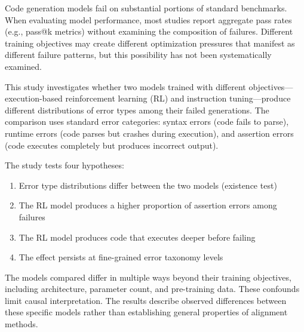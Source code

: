 
Code generation models fail on substantial portions of standard benchmarks. When evaluating model performance, most studies report aggregate pass rates (e.g., pass@k metrics) without examining the composition of failures. Different training objectives may create different optimization pressures that manifest as different failure patterns, but this possibility has not been systematically examined.

This study investigates whether two models trained with different objectives---execution-based reinforcement learning (RL) and instruction tuning---produce different distributions of error types among their failed generations. The comparison uses standard error categories: syntax errors (code fails to parse), runtime errors (code parses but crashes during execution), and assertion errors (code executes completely but produces incorrect output).

The study tests four hypotheses:
\begin{enumerate}
\item Error type distributions differ between the two models (existence test)
\item The RL model produces a higher proportion of assertion errors among failures
\item The RL model produces code that executes deeper before failing
\item The effect persists at fine-grained error taxonomy levels
\end{enumerate}

The models compared differ in multiple ways beyond their training objectives, including architecture, parameter count, and pre-training data. These confounds limit causal interpretation. The results describe observed differences between these specific models rather than establishing general properties of alignment methods.
